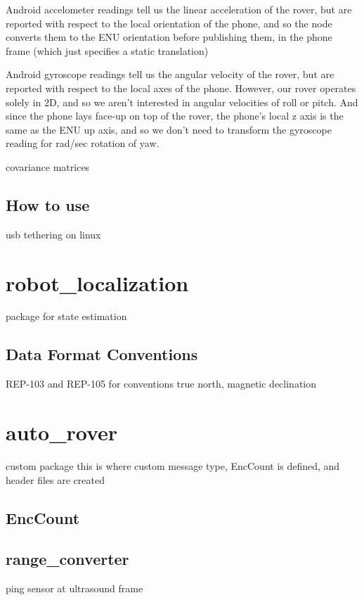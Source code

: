 Android accelometer readings tell us the linear acceleration of the rover, but are reported with respect to the local orientation of the phone, and so the node converts them to the ENU orientation before publishing them, in the phone frame (which just specifies a static translation)

Android gyroscope readings tell us the angular velocity of the rover, but are reported with respect to the local axes of the phone. However, our rover operates solely in 2D, and so we aren't interested in angular velocities of roll or pitch. And since the phone lays face-up on top of the rover, the phone's local z axis is the same as the ENU up axis, and so we don't need to transform the gyroscope reading for rad/sec rotation of yaw.



covariance matrices

\subsection{How to use}
usb tethering
on linux


\section{robot\_localization} \label{sectionRobotLocalization}

package for state estimation

\cite{robot_localization_paper}

\subsection{Data Format Conventions}
REP-103 and REP-105 for conventions
true north, magnetic declination




\section{auto\_rover}
custom package
this is where custom message type, EncCount is defined, and header files are created
\subsection{EncCount} \label{sectionEncCount}

\subsection{range\_converter}
ping sensor at ultrasound frame

